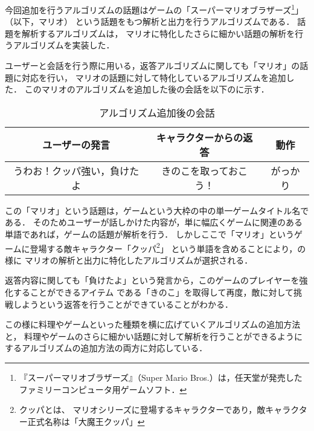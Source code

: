今回追加を行うアルゴリズムの話題はゲームの「スーパーマリオブラザーズ\footnote{『スーパーマリオブラザーズ』（Super Mario Bros.）は，任天堂が発売したファミリーコンピュータ用ゲームソフト．}」（以下，マリオ）
という話題をもつ解析と出力を行うアルゴリズムである．
話題を解析するアルゴリズムは，
マリオに特化したさらに細かい話題の解析を行うアルゴリズムを実装した．

ユーザーと会話を行う際に用いる，返答アルゴリズムに関しても「マリオ」の話題に対応を行い，
マリオの話題に対して特化しているアルゴリズムを追加した．
このマリオのアルゴリズムを追加した後の会話を以下のに示す．

\begin{table}[tbh]
	\caption{アルゴリズム追加後の会話} \label{tab:afterChat}
	\begin{center}
		\begin{tabular}[htb]{c|c|c}
		\hline
		ユーザーの発言 & キャラクターからの返答 & 動作 \\
		\hline
		うわお！クッパ強い，負けたよ & きのこを取っておこう！ & がっかり \\
		\hline
		\end{tabular}
	\end{center}
\end{table}

この「マリオ」という話題は，ゲームという大枠の中の単一ゲームタイトル名である．
そのためユーザーが話しかけた内容が，単に幅広くゲームに関連のある単語であれば，ゲームの話題が解析を行う．
しかしここで「マリオ」というゲームに登場する敵キャラクター「クッパ\footnote{クッパとは、
マリオシリーズに登場するキャラクターであり，敵キャラクター正式名称は「大魔王クッパ」}」
という単語を含めることにより，の様に
マリオの解析と出力に特化したアルゴリズムが選択される．

返答内容に関しても「負けたよ」という発言から，このゲームのプレイヤーを強化することができるアイテム
である「きのこ」を取得して再度，敵に対して挑戦しようという返答を行うことができていることがわかる．

この様に料理やゲームといった種類を横に広げていくアルゴリズムの追加方法と，
料理やゲームのさらに細かい話題に対して解析を行うことができるようにするアルゴリズムの追加方法の両方に対応している．

